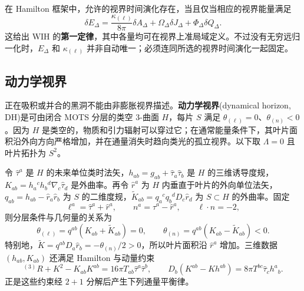 在 Hamilton 框架中，允许的视界时间演化存在，当且仅当相应的视界能量满足
\begin{equation}\label{eq:isolated-horizon-first-law}
    \delta E_\Delta=\frac{\kappa_{(\ell)}}{8\pi}\delta A_\Delta
      +\Omega_\Delta\delta J_\Delta+\Phi_\Delta\delta Q_\Delta .
\end{equation}
这给出 WIH 的\textbf{第一定律}，其中各量均可在视界上准局域定义。不过没有无穷远归一化时，$E_\Delta$ 和 $\kappa_{(\ell)}$ 并非自动唯一；必须连同所选的视界时间演化一起固定。

\subsection{动力学视界}

正在吸积或并合的黑洞不能由非膨胀视界描述。\textbf{动力学视界}(dynamical horizon, DH)是可由闭合 MOTS 分层的类空 3-曲面 $H$，每片 $S$ 满足 $\theta_{(\ell)}=0$、$\theta_{(n)}<0$。因为 $H$ 是类空的，物质和引力辐射可以穿过它；在通常能量条件下，其叶片面积沿外向方向严格增加，并在通量消失时趋向类光的孤立视界。以下取 $\Lambda=0$ 且叶片拓扑为 $S^2$。

令 $\hat\tau^a$ 是 $H$ 的未来单位类时法矢，$h_{ab}=g_{ab}+\hat\tau_a\hat\tau_b$ 是 $H$ 的三维诱导度规，$K_{ab}=h_a{}^ch_b{}^d\nabla_c\hat\tau_d$ 是外曲率。再令 $\hat r^a$ 为 $H$ 内垂直于叶片的外向单位法矢，$q_{ab}=h_{ab}-\hat r_a\hat r_b$ 为 $S$ 的二维度规，$\widetilde K_{ab}=q_a{}^cq_b{}^dD_c\hat r_d$ 为 $S\subset H$ 的外曲率。固定
\[
    \ell^a=\hat\tau^a+\hat r^a,\qquad
    n^a=\hat\tau^a-\hat r^a,\qquad
    \ell\cdot n=-2,
\]
则分层条件与几何量的关系为
\begin{equation}\label{eq:dh-foliation-geometry}
    \theta_{(\ell)}=q^{ab}(K_{ab}+\widetilde K_{ab})=0,
    \qquad
    \theta_{(n)}=q^{ab}(K_{ab}-\widetilde K_{ab})<0.
\end{equation}
特别地，$\widetilde K=q^{ab}D_a\hat r_b=-\theta_{(n)}/2>0$，所以叶片面积沿 $\hat r^a$ 增加。三维数据 $(h_{ab},K_{ab})$ 还满足 Hamilton 与动量约束
\begin{equation}\label{eq:dh-constraints}
    {}^{(3)}R+K^2-K_{ab}K^{ab}
       =16\pi T_{ab}\hat\tau^a\hat\tau^b,
    \qquad
    D_b(K^{ab}-Kh^{ab})
       =8\pi T^{bc}\hat\tau_c h^a{}_b .
\end{equation}
正是这些约束经 $2+1$ 分解后产生下列通量平衡律。

